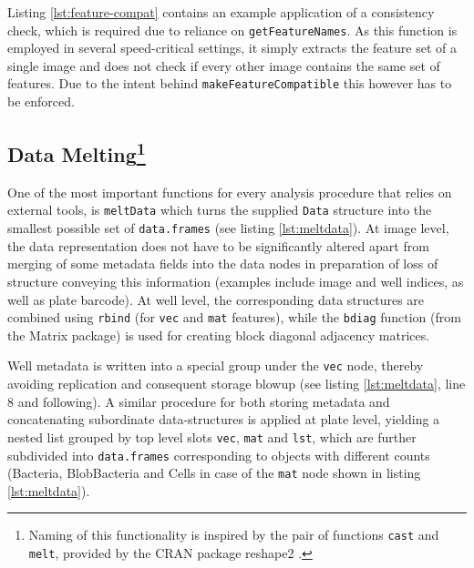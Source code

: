 Listing \ref{lst:feature-compat} contains an example application of a consistency check, which is required due to reliance on \texttt{getFeatureNames}. As this function is employed in several speed-critical settings, it simply extracts the feature set of a single image and does not check if every other image contains the same set of features. Due to the intent behind \texttt{makeFeatureCompatible} this however has to be enforced.

\subsection{Data Melting\footnote{Naming of this functionality is inspired by the pair of functions \texttt{cast} and \texttt{melt}, provided by the CRAN package reshape2 \citep{Wickham2007}.}}
One of the most important functions for every analysis procedure that relies on external tools, is \texttt{meltData} which turns the supplied \texttt{Data} structure into the smallest possible set of \texttt{data.frames} (see listing \ref{lst:meltdata}). At image level, the data representation does not have to be significantly altered apart from merging of some metadata fields into the data nodes in preparation of loss of structure conveying this information (examples include image and well indices, as well as plate barcode). At well level, the corresponding data structures are combined using \texttt{rbind} (for \texttt{vec} and \texttt{mat} features), while the \texttt{bdiag} function (from the Matrix package) is used for creating block diagonal adjacency matrices.

Well metadata is written into a special group under the \texttt{vec} node, thereby avoiding replication and consequent storage blowup (see listing \ref{lst:meltdata}, line 8 and following). A similar procedure for both storing metadata and concatenating subordinate data-structures is applied at plate level, yielding a nested list grouped by top level slots \texttt{vec}, \texttt{mat} and \texttt{lst}, which are further subdivided into \texttt{data.frames} corresponding to objects with different counts (Bacteria, BlobBacteria and Cells in case of the \texttt{mat} node shown in listing \ref{lst:meltdata}).


